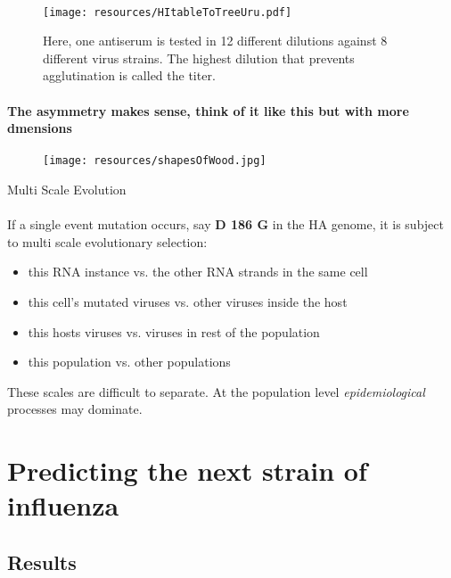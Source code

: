 \documentclass{beamer}
\begin{document}
\begin{darkframes}
    \begin{frame}{\subsecname}
      \framesubtitle{}
      \begin{figure}
        \texttt{[image: resources/HItableToTreeUru.pdf]}
        \caption{\footnotesize Here, one antiserum is tested in 12 different dilutions against 8 different virus strains. The highest dilution that prevents agglutination is called the titer.}
      \end{figure}
    \end{frame}

    \begin{frame}{\subsecname}
      \framesubtitle{\small The asymmetry makes sense, think of it like this but with more dmensions}
      \begin{figure}
        \texttt{[image: resources/shapesOfWood.jpg]}
        \caption{\footnotesize \cite{rosipaw10}}
      \end{figure}
    \end{frame}


    \begin{frame}{Multi Scale Evolution}
      \framesubtitle{}
      If a single event mutation occurs, say \textbf{D 186 G} in the HA genome, it is subject to multi scale evolutionary selection:
      \begin{itemize}
        \item this RNA instance vs. the other RNA strands in the same cell
        \item this cell's mutated viruses vs. other viruses inside the host
        \item this hosts viruses vs. viruses in rest of the population
        \item this population vs. other populations
      \end{itemize}
      These scales are difficult to separate. At the population level \textit{epidemiological} processes may dominate.
    \end{frame}










  \section{Predicting the next strain of influenza}

  \subsection{Results}


\end{darkframes}
\end{document}
